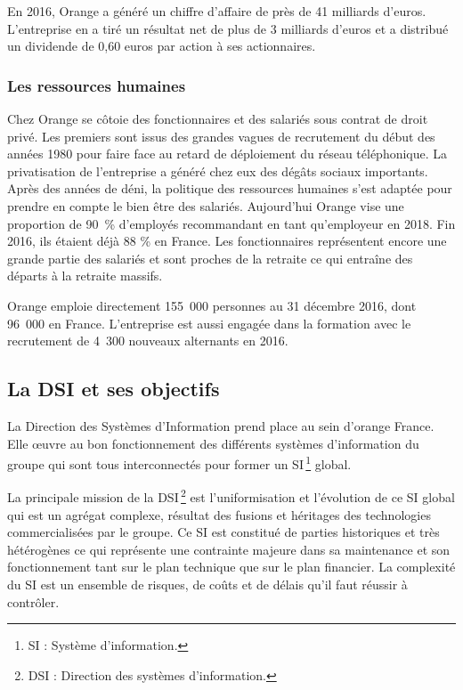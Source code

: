         En 2016, Orange a généré un chiffre d’affaire de près de 41 milliards d’euros.
        L’entreprise en a tiré un résultat net de plus de 3 milliards d’euros et a distribué un dividende de 0,60 euros par action à ses actionnaires.

        \subsubsection{Les ressources humaines}

        Chez Orange se côtoie des fonctionnaires et des salariés sous contrat de droit privé.
        Les premiers sont issus des grandes vagues de recrutement du début des années 1980 pour faire face au retard de déploiement du réseau téléphonique.
        La privatisation de l’entreprise a généré chez eux des dégâts sociaux importants.
        Après des années de déni, la politique des ressources humaines s’est adaptée pour prendre en compte le bien être des salariés.
        Aujourd’hui Orange vise une proportion de 90 \% d’employés recommandant en tant qu’employeur en 2018.
        Fin 2016, ils étaient déjà 88 \% en France.
        Les fonctionnaires représentent encore une grande partie des salariés et sont proches de la retraite ce qui entraîne des départs à la retraite massifs.

        Orange emploie directement 155 000 personnes au 31 décembre 2016, dont 96 000 en France.
        L’entreprise est aussi engagée dans la formation avec le recrutement de 4 300 nouveaux alternants en 2016.

    \subsection{La DSI et ses objectifs}

    La Direction des Systèmes d’Information prend place au sein d’orange France.
    Elle œuvre au bon fonctionnement des différents systèmes d’information du groupe qui sont tous interconnectés pour former un SI\,\footnote{SI : Système d'information.} global.

    La principale mission de la DSI\,\footnote{DSI : Direction des systèmes d'information.} est l’uniformisation et l’évolution de ce SI global qui est un agrégat complexe, résultat des fusions et héritages des technologies commercialisées par le groupe.
    Ce SI est constitué de parties historiques et très hétérogènes ce qui représente une contrainte majeure dans sa maintenance et son fonctionnement tant sur le plan technique que sur le plan financier.
    La complexité du SI est un ensemble de risques, de coûts et de délais qu’il faut réussir à contrôler.

